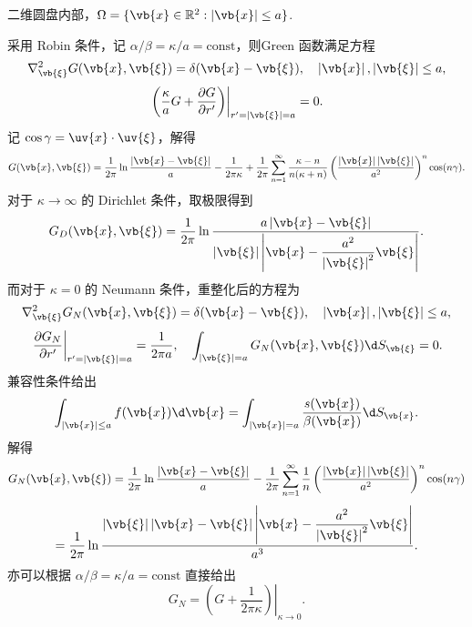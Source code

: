 \begin{example}
	二维圆盘内部，\(\Omega=\{\vb{x}\in\mathbb{R}^2:\left|\vb{x}\right|\leq a\}\).
	
	采用 Robin 条件，记 \(\alpha/\beta=\kappa/a=\mathrm{const}\)，则Green 函数满足方程
	\begin{equation*}
		\nabla_{\vb{\xi}}^2G(\vb{x},\vb{\xi})=\delta(\vb{x}-\vb{\xi}),\quad
		\left|\vb{x}\right|,\left|\vb{\xi}\right|\leq a,
	\end{equation*}
	\begin{equation*}
		\left.\left(\frac{\kappa}{a}G+\frac{\partial G}{\partial r'}\right)\right|_{r'=\left|\vb{\xi}\right|=a}=0.
	\end{equation*}
	记 \(\cos\gamma=\uv{x}\cdot\uv{\xi}\)，解得
	\begin{equation*}
		G(\vb{x},\vb{\xi})
		=\frac{1}{2\pi}\ln\frac{\left|\vb{x}-\vb{\xi}\right|}{a}-\frac{1}{2\pi\kappa}
		+\frac{1}{2\pi}\sum_{n=1}^\infty\frac{\kappa-n}{n(\kappa+n)}\left(\frac{\left|\vb{x}\right|\left|\vb{\xi}\right|}{a^2}\right)^n\cos(n\gamma).
	\end{equation*}
	对于 \(\kappa\to\infty\) 的 Dirichlet 条件，取极限得到
	\begin{equation*}
		G_D(\vb{x},\vb{\xi})
		=\frac{1}{2\pi}\ln\frac{a\left|\vb{x}-\vb{\xi}\right|}{\left|\vb{\xi}\right|\left|\vb{x}-\dfrac{a^2}{\left|\vb{\xi}\right|^2}\vb{\xi}\right|}.
	\end{equation*}
	而对于 \(\kappa=0\) 的 Neumann 条件，重整化后的方程为
	\begin{equation*}
		\nabla_{\vb{\xi}}^2G_N(\vb{x},\vb{\xi})=\delta(\vb{x}-\vb{\xi}),\quad
		\left|\vb{x}\right|,\left|\vb{\xi}\right|\leq a,
	\end{equation*}
	\begin{equation*}
		\left.\frac{\partial G_N}{\partial r'}\right|_{r'=\left|\vb{\xi}\right|=a}=\frac{1}{2\pi a},\quad
		\int_{\left|\vb{\xi}\right|=a}G_N(\vb{x},\vb{\xi})\d S_{\vb{\xi}}=0.
	\end{equation*}
	兼容性条件给出
	\begin{equation*}
		\int_{\left|\vb{x}\right|\leq a}f(\vb{x})\d\vb{x}
		=\int_{\left|\vb{x}\right|=a}\frac{s(\vb{x})}{\beta(\vb{x})}\d S_{\vb{x}}.
	\end{equation*}
	解得
	\begin{equation*}
		G_N(\vb{x},\vb{\xi})
		=\frac{1}{2\pi}\ln\frac{\left|\vb{x}-\vb{\xi}\right|}{a}
		-\frac{1}{2\pi}\sum_{n=1}^\infty\frac{1}{n}\left(\frac{\left|\vb{x}\right|\left|\vb{\xi}\right|}{a^2}\right)^n\cos(n\gamma)
	\end{equation*}
	\begin{equation*}
		=\frac{1}{2\pi}\ln\frac{\left|\vb{\xi}\right|\left|\vb{x}-\vb{\xi}\right|\left|\vb{x}-\dfrac{a^2}{\left|\vb{\xi}\right|^2}\vb{\xi}\right|}{a^3}.
	\end{equation*}
	亦可以根据 \(\alpha/\beta=\kappa/a=\mathrm{const}\) 直接给出
	\begin{equation*}
		G_N=\left.\left(G+\frac{1}{2\pi\kappa}\right)\right|_{\kappa\to0}.
	\end{equation*}
\end{example}

